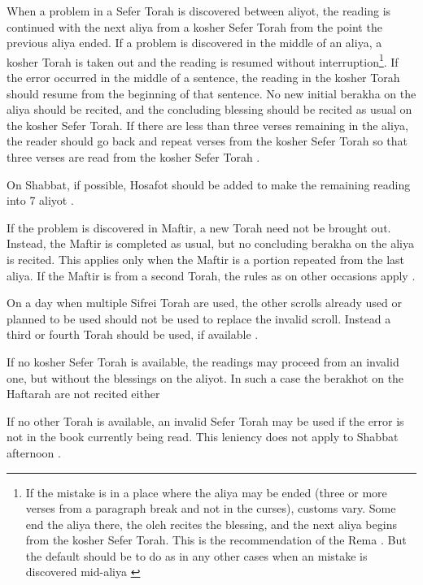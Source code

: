 \documentclass[11pt]{article}
\begin{document}
When a problem in a Sefer Torah is discovered between aliyot, the reading is continued with the next aliya from a kosher Sefer Torah from the point the previous aliya ended. If a problem is discovered in the middle of an aliya, a kosher Torah is taken out and the reading is resumed without interruption\footnote{If the mistake is in a place where the aliya may be ended (three or more verses from a paragraph break and not in the curses), customs vary. Some end the aliya there, the oleh recites the blessing, and the next aliya begins from the kosher Sefer Torah.  This is the recommendation of the Rema \parencite*[22:2 citing OC 146]{PH}.  But the default should be to do as in any other cases when an mistake is discovered mid-aliya \parencite*[24:8]{Kitzur}}. If the error occurred in the middle of a sentence, the reading in the kosher Torah should resume from the beginning of that sentence.  No new initial berakha on the aliya should be recited, and the concluding blessing should be recited as usual on the kosher Sefer Torah. If there are less than three verses remaining in the aliya, the reader should go back and repeat verses from the kosher Sefer Torah so that three verses are read from the kosher Sefer Torah \parencite*[24:8]{Kitzur}.

On Shabbat, if possible, Hosafot should be added to make the remaining reading into 7 aliyot \parencite*[24:7]{Kitzur}.

If the problem is discovered in Maftir, a new Torah need not be brought out.  Instead, the Maftir is completed as usual, but no concluding berakha on the aliya is recited.  This applies only when the Maftir is a portion repeated from the last aliya.  If the Maftir is from a second Torah, the rules as on other occasions apply \parencite*[78:8]{Kitzur}.

On a day when multiple Sifrei Torah are used, the other scrolls already used or planned to be used should not be used to replace the invalid scroll.  Instead a third or fourth Torah should be used, if available \parencite*[78:10]{Kitzur}.

If no kosher Sefer Torah is available, the readings may proceed from an invalid one, but without the blessings on the aliyot.  In such a case the berakhot on the Haftarah are not recited either \parencite*[79:10]{Kitzur}

If no other Torah is available, an invalid Sefer Torah may be used if the error is not in the book currently being read.  This leniency does not apply to Shabbat afternoon \parencite*[24:10]{Kitzur}.

\printbibliography
\end{document}
